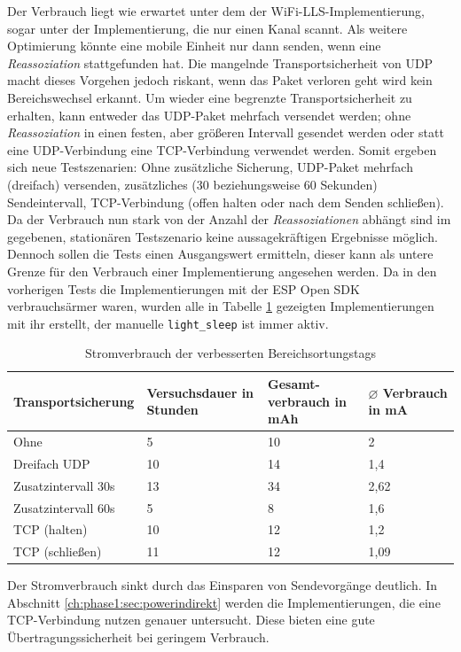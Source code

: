 Der Verbrauch liegt wie erwartet unter dem der WiFi-LLS-Implementierung, sogar unter der Implementierung, die nur einen Kanal scannt.
Als weitere Optimierung könnte eine mobile Einheit nur dann senden, wenn eine \emph{Reassoziation} stattgefunden hat.
Die mangelnde Transportsicherheit von UDP macht dieses Vorgehen jedoch riskant, wenn das Paket verloren geht wird kein Bereichswechsel erkannt.
Um wieder eine begrenzte Transportsicherheit zu erhalten, kann entweder das UDP-Paket mehrfach versendet werden; ohne \emph{Reassoziation} in einen festen, aber größeren Intervall gesendet werden oder statt eine UDP-Verbindung eine TCP-Verbindung verwendet werden.
Somit ergeben sich neue Testszenarien: Ohne zusätzliche Sicherung, UDP-Paket mehrfach (dreifach) versenden, zusätzliches (30 beziehungsweise 60 Sekunden) Sendeintervall, TCP-Verbindung (offen halten oder nach dem Senden schließen). \\
Da der Verbrauch nun stark von der Anzahl der \emph{Reassoziationen} abhängt sind im gegebenen, stationären Testszenario keine aussagekräftigen Ergebnisse möglich.
Dennoch sollen die Tests einen Ausgangswert ermitteln, dieser kann als untere Grenze für den Verbrauch einer Implementierung angesehen werden.
Da in den vorherigen Tests die Implementierungen mit der ESP Open SDK verbrauchsärmer waren, wurden alle in Tabelle \ref{table:naiveoptconsumption} gezeigten Implementierungen mit ihr erstellt, der manuelle \texttt{light\_sleep} ist immer aktiv.

\begin{table}[h]
	\centering
	\caption{Stromverbrauch der verbesserten Bereichsortungstags}
	\label{table:naiveoptconsumption}
	\begin{tabular}{l|p{2.7cm}|p{3.4cm}|p{2.5cm}}
		Transportsicherung & Versuchsdauer in Stunden & Gesamt-verbrauch in mAh & $\varnothing$ Verbrauch in mA \\
		\hline
		Ohne & 5 & 10 & 2 \\
		Dreifach UDP & 10 & 14 & 1,4 \\
		Zusatzintervall 30s & 13 & 34 & 2,62 \\
		Zusatzintervall 60s & 5 & 8 & 1,6 \\
		TCP (halten) & 10 & 12 & 1,2 \\
		TCP (schließen) & 11 & 12 & 1,09 \\
	\end{tabular}
\end{table}

Der Stromverbrauch sinkt durch das Einsparen von Sendevorgänge deutlich.
In Abschnitt \ref{ch:phase1:sec:powerindirekt} werden die Implementierungen, die eine TCP-Verbindung nutzen genauer untersucht.
Diese bieten eine gute Übertragungssicherheit bei geringem Verbrauch.


